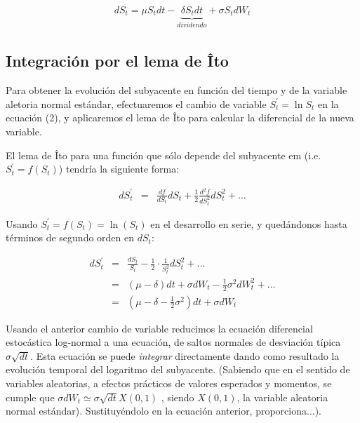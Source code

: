 \documentclass[12pt]{article}
\begin{document}
\begin{eqnarray}
	dS_{t} = \mu S_{t}dt - \underbrace{\delta S_{t}dt}_{dividendo} + \sigma S_{t}dW_{t}
\end{eqnarray}

\subsection{Integraci\'{o}n por el lema de \^{I}to}

Para obtener la evoluci\'{o}n del subyacente en funci\'{o}n del tiempo y de la variable aletoria normal est\'{a}ndar,
efectuaremos el cambio de variable $S^{'}_{t}=\ln S_{t}$ en la ecuaci\'{o}n (2), y aplicaremos el lema de \^{I}to para 
calcular la diferencial de la nueva variable.
\newline

El lema de \^{I}to para una funci\'{o}n que s\'{o}lo depende del subyacente {em (i.e.\ $S_{t}^{'}=f(S_{t})$)} tendr\'{i}a
la siguiente forma:
\newline

\begin{eqnarray}
	dS_{t}^{'} & = & \frac{df}{dS_{t}}dS_{t} + \frac{1}{2}\frac{d^{2}f}{dS_{t}^{2}}dS_{t}^{2} + \ldots
\end{eqnarray} 

Usando $S_{t}^{'} = f(S_{t}) = \ln(S_{t})$ en el desarrollo en serie, y qued\'{a}ndonos hasta t\'{e}rminos de segundo orden en $dS_{t}$:
\newline

\begin{eqnarray}
	dS_{t}^{'}	& = & \frac{dS_{t}}{S_{t}} - \frac{1}{2}\cdot\frac{1}{S_{t}^{2}}dS_{t}^{2} + \ldots \nonumber \\
			& = & \left( \mu - \delta \right) dt + \sigma dW_{t} - \frac{1}{2}\sigma^{2}dW_{t}^{2} + \ldots \nonumber \\
			& = & \left( \mu - \delta - \frac{1}{2}\sigma^{2} \right)dt + \sigma dW_{t} 		 
\end{eqnarray}

Usando el anterior cambio de variable reducimos la ecuaci\'{o}n diferencial estoc\'{a}stica log-normal a una ecuaci\'{o}n, de saltos normales de
desviaci\'{o}n t\'{i}pica $\sigma \sqrt{dt}$. Esta ecuaci\'{o}n se puede {\em integrar} directamente dando como resultado la evoluci\'{o}n
temporal del logaritmo del subyacente. (Sabiendo que en el sentido de variables aleatorias, a efectos pr\'{a}cticos de valores esperados y momentos, se cumple que $\sigma dW_{t} \simeq \sigma \sqrt{dt} X \left( 0,1 \right)$ , siendo 
$ X \left( 0, 1 \right)$, la variable aleatoria normal est\'{a}ndar). Sustituy\'{e}ndolo en la ecuaci\'{o}n anterior, proporciona...).
\newline
\end{document}
